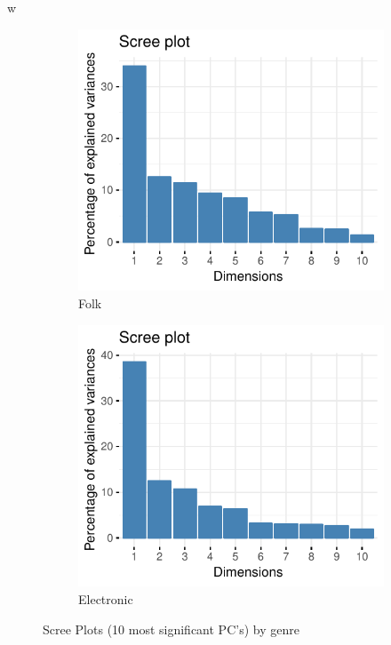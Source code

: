 w\documentclass[11pt, oneside]{article}
\begin{document}
\begin{figure}[h]
    \begin{subfigure}[b]{0.5\textwidth}
        \includegraphics[width=\textwidth]{folk_scree.pdf} 
        \caption{Folk}
    \end{subfigure}%
    \begin{subfigure}[b]{0.5\textwidth}
        \includegraphics[width=\textwidth]{elec_scree.pdf} 
        \caption{Electronic}
    \end{subfigure}%
\caption{Scree Plots (10 most significant PC's) by genre}
\label{fig:scree}
\end{figure}
\end{document}
